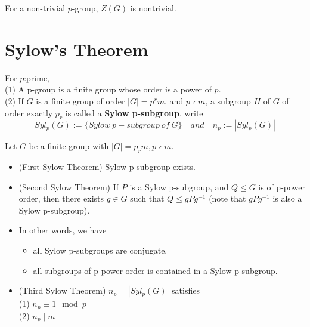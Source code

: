 \documentclass[11pt,fleqn]{book} %
\begin{document}
\begin{CJK}{UTF8}{gkai}
\begin{proposition}
	For a non-trivial $p$-group, $Z(G)$ is nontrivial. 
\end{proposition}

\section{Sylow's Theorem}
\begin{definition}
	For $p$:prime, \\
	(1) A p-group is a finite group whose order is a power of $p$. \\
	(2) If $G$ is a finite group of order $|G|=p^rm$, and $p\nmid m$, a subgroup $H$ of $G$ of order exactly $p_r$ is called a {\bf Sylow p-subgroup}. write 
	\[Syl_p(G):=\{Sylow \ p-subgroup \ of \ G\} \quad and \quad n_p := |Syl_p(G)|\]
\end{definition}

\begin{theorem}
	Let $G$ be a finite group with $|G| = p_rm,p\nmid m$. \\
	\begin{itemize}
		\item (First Sylow Theorem) Sylow p-subgroup exists. 
		\item (Second Sylow Theorem) If $P$ is a Sylow p-subgroup, and $Q \leq G$ is of p-power order, then there exists $g \in G$ such that $Q \leq gPg^{-1}$ (note that $gPg^{-1}$ is also a Sylow p-subgroup).
		\item In other words, we have \begin{itemize}
			\item all Sylow p-subgroups are conjugate.
			\item all subgroups of p-power order is contained in a Sylow p-subgroup.
		\end{itemize}
		\item (Third Sylow Theorem) $n_p = |Syl_p(G)|$ satisfies \\
		(1) $n_p \equiv 1\mod p$ \\
		(2) $n_p \mid m$
	\end{itemize}	
\end{theorem}


\end{CJK}
\end{document}
